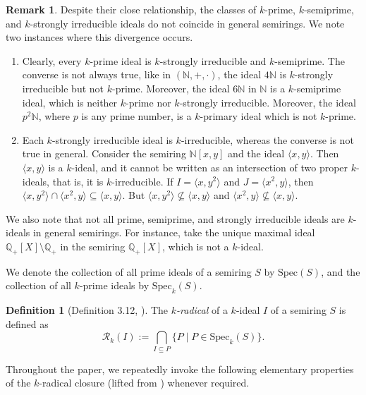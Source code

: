 \documentclass[11pt,leqno]{amsart}
\theoremstyle{definition}
\newtheorem{definition}[theorem]{Definition}
\newtheorem{remark}[theorem]{Remark}
\numberwithin{equation}{section}
\begin{document}
\begin{remark}\label{Remark: ideal classes are different} Despite their close relationship, the classes of $k$-prime, $k$-semiprime, and $k$-strongly irreducible ideals do not coincide in general semirings. We note two instances where this divergence occurs. 
\begin{enumerate}
    \item Clearly, every $k$-prime ideal is $k$-strongly irreducible and $k$-semiprime. The converse is not always true, like in $(\mathds{N},+,\cdot)$, the ideal $4\mathds{N}$ is $k$-strongly irreducible but not $k$-prime. Moreover, the ideal $6\mathds{N}$ in $\mathds{N}$ is a $k$-semiprime ideal, which is neither $k$-prime nor $k$-strongly irreducible. Moreover, the ideal $p^2\mathds{N}$, where $p$ is any prime number, is a $k$-primary ideal which is not $k$-prime. 
    \item Each $k$-strongly irreducible ideal is $k$-irreducible, whereas the converse is not true in general. Consider the semiring $\mathds{N}[x,y]$ and the ideal $\langle x,y\rangle$. Then $\langle x,y\rangle$ is a $k$-ideal, and it cannot be written as an intersection of two proper $k$-ideals, that is, it is $k$-irreducible. If $I=\langle x,y^2\rangle$ and $J=\langle x^2,y\rangle$, then $\langle x,y^2\rangle \cap \langle x^2,y\rangle \subseteq \langle x,y\rangle$. But $\langle x,y^2\rangle \nsubseteq \langle x,y\rangle$ and $\langle x^2,y\rangle \nsubseteq \langle x,y\rangle$. 
\end{enumerate}
    We also note that not all prime, semiprime, and strongly irreducible ideals are $k$-ideals in general semirings. For instance, take the unique maximal ideal $\mathds{Q}_+[X]\setminus \mathds{Q}_+$ in the semiring $\mathds{Q}_+[X]$, which is not a $k$-ideal. 
\end{remark}

We denote the collection of all prime ideals of a semiring $S$ by $\mathrm{Spec}(S)$, and the collection of all $k$-prime ideals by $\mathrm{Spec}_k(S)$. 

\begin{definition}[Definition 3.12, \cite{GoswamiDube24}]
    The \emph{$k$-radical} of a $k$-ideal $I$ of a semiring $S$ is defined as \[\mathcal{R}_k(I):=\bigcap_{I\subseteq P}\{P\mid P\in \mathrm{Spec}_k(S)\}.\]
\end{definition}

 Throughout the paper, we repeatedly invoke the following elementary properties of the $k$-radical closure (lifted from \cite[Lemma 3.13]{GoswamiDube24}) whenever required.
\end{document}

